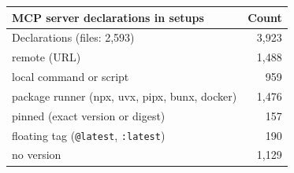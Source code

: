 \begin{tabular}{@{}lr@{}}
\toprule
MCP server declarations in setups & Count \\
\midrule
Declarations (files: 2,593) & 3,923 \\
\quad remote (URL) & 1,488 \\
\quad local command or script & 959 \\
\quad package runner (npx, uvx, pipx, bunx, docker) & 1,476 \\
\qquad pinned (exact version or digest) & 157 \\
\qquad floating tag (\texttt{@latest}, \texttt{:latest}) & 190 \\
\qquad no version & 1,129 \\
\bottomrule
\end{tabular}
